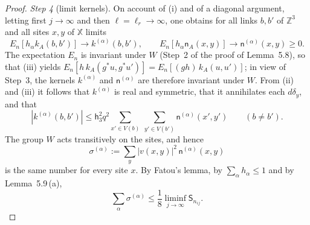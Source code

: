 \documentclass[11pt]{amsart}
\theoremstyle{definition}
\begin{document}
\begin{proof}
\emph{Step 4} (limit kernels).
On account of (i) and of a diagonal argument, letting first $j\to\infty$ and then $\ell=\ell_r\to\infty$, one obtains for all links $b,b'$ of $\mathbb Z^3$ and all sites $x,y$ of $\mathbb X$ limits
\begin{equation*}
E_n[h_\alpha k_A(b,b')]\to k^{(\alpha)}(b,b'),\qquad E_n[h_\alpha\mathsf n_A(x,y)]\to\mathsf n^{(\alpha)}(x,y)\ge0.
\end{equation*}
The expectation $E_n$ is invariant under $W$ (Step~2 of the proof of Lemma~5.8), so that (iii) yields $E_n[h\,k_A(g^*u,g^*u')]=E_n[(gh)\,k_A(u,u')]$;
in view of Step~3, the kernels $k^{(\alpha)}$ and $\mathsf n^{(\alpha)}$ are therefore invariant under $W$.
From (ii) and (iii) it follows that $k^{(\alpha)}$ is real and symmetric, that it annihilates each $d\delta_y$, and that
\begin{equation*}
|k^{(\alpha)}(b,b')|\le\mathsf h_3^2q^2\sum_{x'\in V(b)}\ \sum_{y'\in V(b')}\mathsf n^{(\alpha)}(x',y')\qquad(b\ne b').
\end{equation*}
The group $W$ acts transitively on the sites, and hence
\begin{equation*}
\sigma^{(\alpha)}:=\sum_y|v(x,y)|^2\,\mathsf n^{(\alpha)}(x,y)
\end{equation*}
is the same number for every site $x$.
By Fatou's lemma, by $\sum_\alpha h_\alpha\le1$ and by Lemma~5.9\,(a),
\begin{equation*}
\sum_\alpha\sigma^{(\alpha)}\le\frac18\liminf_{j\to\infty}\mathsf S_{n_{ij}}.
\end{equation*}


\end{proof}
\end{document}
